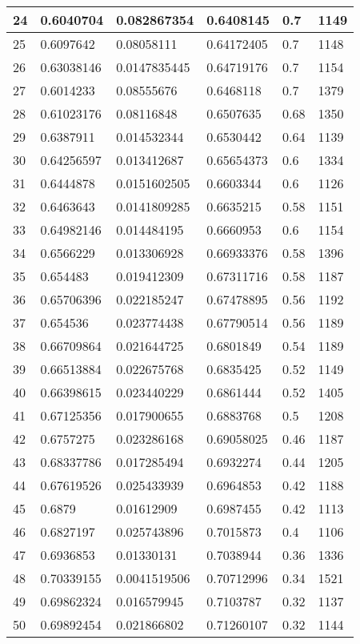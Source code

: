\begin{longtable}{|l|l|l|l|l|l|}
24 & 0.6040704 & 0.082867354 & 0.6408145 & 0.7 & 1149 \\ \hline 
25 & 0.6097642 & 0.08058111 & 0.64172405 & 0.7 & 1148 \\ \hline 
26 & 0.63038146 & 0.0147835445 & 0.64719176 & 0.7 & 1154 \\ \hline 
27 & 0.6014233 & 0.08555676 & 0.6468118 & 0.7 & 1379 \\ \hline 
28 & 0.61023176 & 0.08116848 & 0.6507635 & 0.68 & 1350 \\ \hline 
29 & 0.6387911 & 0.014532344 & 0.6530442 & 0.64 & 1139 \\ \hline 
30 & 0.64256597 & 0.013412687 & 0.65654373 & 0.6 & 1334 \\ \hline 
31 & 0.6444878 & 0.0151602505 & 0.6603344 & 0.6 & 1126 \\ \hline 
32 & 0.6463643 & 0.0141809285 & 0.6635215 & 0.58 & 1151 \\ \hline 
33 & 0.64982146 & 0.014484195 & 0.6660953 & 0.6 & 1154 \\ \hline 
34 & 0.6566229 & 0.013306928 & 0.66933376 & 0.58 & 1396 \\ \hline 
35 & 0.654483 & 0.019412309 & 0.67311716 & 0.58 & 1187 \\ \hline 
36 & 0.65706396 & 0.022185247 & 0.67478895 & 0.56 & 1192 \\ \hline 
37 & 0.654536 & 0.023774438 & 0.67790514 & 0.56 & 1189 \\ \hline 
38 & 0.66709864 & 0.021644725 & 0.6801849 & 0.54 & 1189 \\ \hline 
39 & 0.66513884 & 0.022675768 & 0.6835425 & 0.52 & 1149 \\ \hline 
40 & 0.66398615 & 0.023440229 & 0.6861444 & 0.52 & 1405 \\ \hline 
41 & 0.67125356 & 0.017900655 & 0.6883768 & 0.5 & 1208 \\ \hline 
42 & 0.6757275 & 0.023286168 & 0.69058025 & 0.46 & 1187 \\ \hline 
43 & 0.68337786 & 0.017285494 & 0.6932274 & 0.44 & 1205 \\ \hline 
44 & 0.67619526 & 0.025433939 & 0.6964853 & 0.42 & 1188 \\ \hline 
45 & 0.6879 & 0.01612909 & 0.6987455 & 0.42 & 1113 \\ \hline 
46 & 0.6827197 & 0.025743896 & 0.7015873 & 0.4 & 1106 \\ \hline 
47 & 0.6936853 & 0.01330131 & 0.7038944 & 0.36 & 1336 \\ \hline 
48 & 0.70339155 & 0.0041519506 & 0.70712996 & 0.34 & 1521 \\ \hline 
49 & 0.69862324 & 0.016579945 & 0.7103787 & 0.32 & 1137 \\ \hline 
50 & 0.69892454 & 0.021866802 & 0.71260107 & 0.32 & 1144 \\ \hline 
\end{longtable}